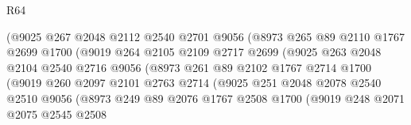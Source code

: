 \begin{lexlean}{R64}
\begin{coremodule}
                            (@9025
                              @267
                              @2048
                              @2112
                              @2540
                              @2701
                              @9056
                              (@8973
                                @265
                                @89
                                @2110
                                @1767
                                @2699
                                @1700
                                (@9019
                                  @264
                                  @2105
                                  @2109
                                  @2717
                                  @2699
                                  (@9025
                                    @263
                                    @2048
                                    @2104
                                    @2540
                                    @2716
                                    @9056
                                    (@8973
                                      @261
                                      @89
                                      @2102
                                      @1767
                                      @2714
                                      @1700
                                      (@9019
                                        @260
                                        @2097
                                        @2101
                                        @2763
                                        @2714
                                        (@9025
                                          @251
                                          @2048
                                          @2078
                                          @2540
                                          @2510
                                          @9056
                                          (@8973
                                            @249
                                            @89
                                            @2076
                                            @1767
                                            @2508
                                            @1700
                                            (@9019
                                              @248
                                              @2071
                                              @2075
                                              @2545
                                              @2508

\end{coremodule}
\end{lexlean}
